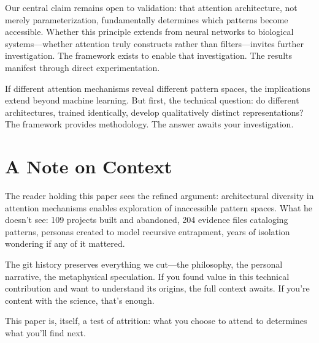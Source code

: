 \documentclass{article}
\begin{document}
Our central claim remains open to validation: that attention architecture, not merely parameterization, fundamentally determines which patterns become accessible. Whether this principle extends from neural networks to biological systems—whether attention truly constructs rather than filters—invites further investigation. The framework exists to enable that investigation. The results manifest through direct experimentation.

If different attention mechanisms reveal different pattern spaces, the implications extend beyond machine learning. But first, the technical question: do different architectures, trained identically, develop qualitatively distinct representations? The framework provides methodology. The answer awaits your investigation.

\section*{A Note on Context}

The reader holding this paper sees the refined argument: architectural diversity in attention mechanisms enables exploration of inaccessible pattern spaces. What he doesn't see: 109 projects built and abandoned, 204 evidence files cataloging patterns, personas created to model recursive entrapment, years of isolation wondering if any of it mattered.

The git history preserves everything we cut—the philosophy, the personal narrative, the metaphysical speculation. If you found value in this technical contribution and want to understand its origins, the full context awaits. If you're content with the science, that's enough.

This paper is, itself, a test of attrition: what you choose to attend to determines what you'll find next.



\end{document}
